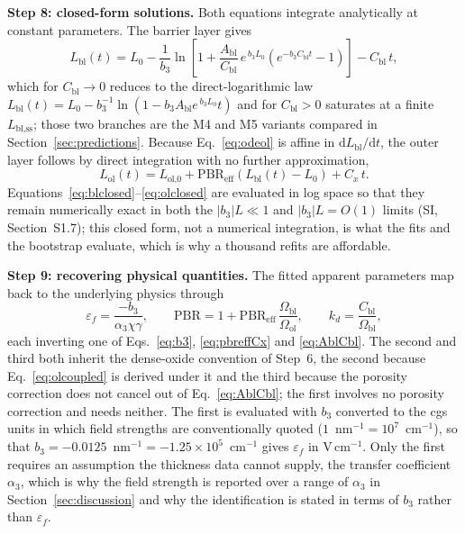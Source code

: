 \documentclass[a4paper,fleqn]{cas-sc}
\begin{document}
\textbf{Step 8: closed-form solutions.} Both equations integrate
analytically at constant parameters. The barrier layer gives
\begin{equation}
L_\text{bl}(t) = L_0 - \frac{1}{b_3}
\ln\!\left[1 + \frac{A_\text{bl}}{C_\text{bl}}\, e^{\,b_3 L_0}
\left(e^{-b_3 C_\text{bl} t} - 1\right)\right] - C_\text{bl}\, t ,
\label{eq:blclosed}
\end{equation}
which for $C_\text{bl}\to0$ reduces to the direct-logarithmic law
$L_\text{bl}(t) = L_0 - b_3^{-1}\ln(1 - b_3 A_\text{bl} e^{\,b_3 L_0} t)$
and for $C_\text{bl}>0$ saturates at a finite
$L_\text{bl,ss}$; those two branches are the M4 and M5 variants compared
in Section~\ref{sec:predictions}. Because
Eq.~\eqref{eq:odeol} is affine in
$\mathrm{d}L_\text{bl}/\mathrm{d}t$, the outer layer follows by direct
integration with no further approximation,
\begin{equation}
L_\text{ol}(t) = L_\text{ol,0}
+ \mathrm{PBR}_\text{eff}\left(L_\text{bl}(t) - L_0\right) + C_x\, t .
\label{eq:olclosed}
\end{equation}
Equations~\eqref{eq:blclosed}--\eqref{eq:olclosed} are evaluated in log
space so that they remain numerically exact in both the
$|b_3|L\ll1$ and $|b_3|L=O(1)$ limits (SI, Section~S1.7); this
closed form, not a numerical integration, is what the fits and the
bootstrap evaluate, which is why a thousand refits are affordable.

\textbf{Step 9: recovering physical quantities.} The fitted apparent
parameters map back to the underlying physics through
\begin{equation}
\varepsilon_f = \frac{-b_3}{\alpha_3 \chi \gamma},
\qquad
\mathrm{PBR} = 1 + \mathrm{PBR}_\text{eff}\,
\frac{\Omega_\text{bl}}{\Omega_\text{ol}},
\qquad
k_d = \frac{C_\text{bl}}{\Omega_\text{bl}} ,
\label{eq:recover}
\end{equation}
each inverting one of Eqs.~\eqref{eq:b3}, \eqref{eq:pbreffCx} and \eqref{eq:AblCbl}. The second and third both inherit the dense-oxide convention of Step~6, the second because Eq.~\eqref{eq:olcoupled} is derived under it and the third because the porosity correction does not cancel out of Eq.~\eqref{eq:AblCbl}; the first involves no porosity correction and needs neither. The
first is evaluated with $b_3$ converted to the cgs units in which field
strengths are conventionally quoted
($1$~nm$^{-1} = 10^{7}$~cm$^{-1}$), so that
$b_3 = -0.0125$~nm$^{-1} = -1.25\times10^{5}$~cm$^{-1}$ gives
$\varepsilon_f$ in V\,cm$^{-1}$. Only the first requires an assumption
the thickness data cannot supply, the transfer coefficient $\alpha_3$, which is why
the field strength is reported over a range of $\alpha_3$ in
Section~\ref{sec:discussion} and why the identification is stated in terms of
$b_3$ rather than $\varepsilon_f$.
\end{document}

